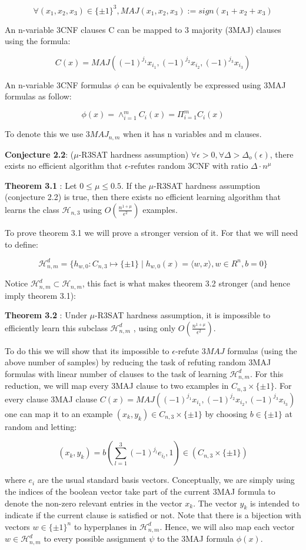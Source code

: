 \documentclass[12pt]{report}
\begin{document}
$$\forall (x_1, x_2, x_3) \in \{ \pm 1 \}^3, MAJ(x_1, x_2, x_3 ) := sign(x_1 + x_2 + x_3 )$$

An n-variable 3CNF clauses C can be mapped to 3 majority (3MAJ) clauses using the formula:

$$ C(x) = MAJ( (-1)^{j_1}x_{i_1} , (-1)^{j_2}x_{i_2} , (-1)^{j_3}x_{i_3} )$$

An n-variable 3CNF formulas $\phi$ can be equivalently be expressed using 3MAJ formulas as follow:

$$ \phi(x) = \wedge^m_{i=1} C_{i}(x)  = \Pi^m_{i=1} C_{i}(x) $$

To denote this we use $3MAJ_{n,m}$ when it has n variables and m clauses.

\textbf{Conjecture 2.2}: ($\mu$-R3SAT hardness assumption) $\forall \epsilon > 0, \forall \Delta > \Delta_o(\epsilon) $, there exists no efficient algorithm that $\epsilon$-refutes random 3CNF with ratio $\Delta \cdot n^{\mu}$  


\textbf{Theorem 3.1 }: Let $0 \leq \mu \leq 0.5$. If the $\mu$-R3SAT hardness assumption (conjecture 2.2) is true, then there exists no efficient learning algorithm that learns the class $\mathcal{H}_{n,3}$ using $O \left(  \frac{n^{1 + \mu }}{\epsilon^2} \right)$ examples.

To prove theorem 3.1 we will prove a stronger version of it. For that we will need to define:

$$ \mathcal{H}^d_{n,m} = \{ h_{w,0} : C_{n, 3} \mapsto \{ \pm 1\} \mid h_{w,0}(x) = \langle w, x \rangle, w \in R^n, b = 0 \}$$

Notice $\mathcal{H}^d_{n,m} \subset \mathcal{H}_{n,m}$, this fact is what makes theorem 3.2 stronger (and hence imply theorem 3.1):

\textbf{Theorem 3.2 }: Under $\mu$-R3SAT hardness assumption, it is impossible to efficiently learn this subclass  $\mathcal{H}^d_{n,m}$ , using only $O \left(  \frac{n^{1 + \mu }}{\epsilon^2} \right)$.

To do this we will show that its impossible to $\epsilon$-refute $3MAJ$ formulas (using the above number of samples) by reducing the task of refuting random 3MAJ formulas with linear number of clauses to the task of learning $ \mathcal{H}^d_{n,m} $. For this reduction, we will map every 3MAJ clause to two examples in $C_{n,3} \times \{ \pm 1 \}$. For every clause 3MAJ clause $ C(x) = MAJ( (-1)^{j_1}x_{i_1} , (-1)^{j_2}x_{i_2} , (-1)^{j_3}x_{i_3} )$ one can map it to an example $(x_k , y_k) \in C_{n , 3} \times \{ \pm 1\}$ by choosing $b \in \{ \pm 1\}$ at random and letting:

$$(x_k, y_k) = b (\sum^3_{l=1} (-1)^{j_l} e_{i_l}, 1) \in (C_{n,3} \times \{ \pm 1 \})$$

where $e_i$ are the usual standard basis vectors.
Conceptually, we are simply using the indices of the boolean vector take part of the current 3MAJ formula to denote the non-zero relevant entries in the vector $x_k$. The vector $y_k$ is intended to indicate if the current clause is satisfied or not.
Note that there is a bijection with vectors $w \in \{ \pm 1 \}^n $ to hyperplanes in $\mathcal{H}^d_{n,m}$. Hence, we will also map each vector $w \in\mathcal{H}^d_{n,m}$ to every possible assignment $\psi$ to the 3MAJ formula $\phi(x)$.
\end{document}
